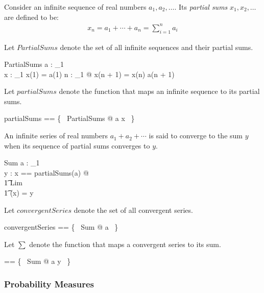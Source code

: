 \documentclass{article}
\begin{document}
Consider an infinite sequence of real numbers $a_1, a_2, \ldots$.
Its {\it partial sums} $x_1, x_2, \ldots$ are defined to be:
\begin{eqnarray}
	x_n = a_1 + \cdots + a_n = \sum_{i = 1}^n a_i
\end{eqnarray}

Let $PartialSums$ denote the set of all infinite sequences and their partial sums.
\begin{schema}{PartialSums}
	a : \nat_1 \fun \real \\
	x : \nat_1 \fun \real
\where
	x(1) = a(1)
\also
	\forall n : \nat_1 @ x(n + 1) = x(n) \realadd a(n + 1)
\end{schema}

Let $partialSums$ denote the function that maps an infinite sequence to its partial sums.
\begin{zed}
	partialSums == \{~ PartialSums @ a \mapsto x ~\}
\end{zed}

An infinite series of real numbers $a_1 + a_2 + \cdots$ is said to converge to the sum $y$ when its
sequence of partial sums converges to $y$.

\begin{schema}{Sum}
	a : \nat_1 \fun \real \\
	y : \real
\where
	\LET x == partialSums(a) @ \\
\t1		Lim \land \\
\t1		\reallim(x) = y
\end{schema}

Let $convergentSeries$ denote the set of all convergent series.
\begin{zed}
	convergentSeries == \{~ Sum @ a ~\}
\end{zed}

\newcommand{\realsum}{\sum}

Let $\realsum$ denote the function that maps a convergent series to its sum.
\begin{zed}
	\realsum == \{~ Sum @ a \mapsto y ~\}
\end{zed}

\subsubsection{Probability Measures}
\end{document}

